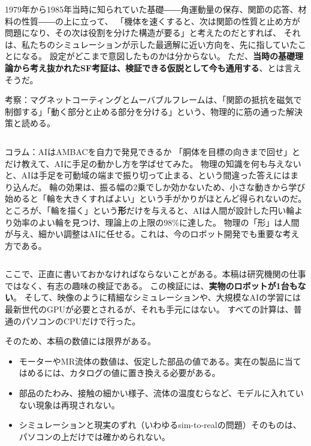 \documentclass[paper=a4paper,fontsize=10pt,twocolumn,column_gap=2zw,line_length=24zw,number_of_lines=46,head_space=18mm]{jlreq}
\makeatletter
\newcounter{msec}
\renewcommand{\section}{\@ifstar{\msecstar}{\msecbox}}
\newcommand{\msecstar}[1]{\par\addvspace{0.6\baselineskip}\noindent{\bfseries\color{accent2}#1}\par\nopagebreak\vspace{0.2\baselineskip}}
\newcommand{\msecbox}[1]{\par\addvspace{0.8\baselineskip}\refstepcounter{msec}%
  \noindent\colorbox{accent2}{\parbox{\dimexpr\linewidth-2\fboxsep}{\color{white}\bfseries\large\strut\themsec\quad #1}}%
  \par\nopagebreak\vspace{0.4\baselineskip}\nopagebreak}
\makeatother
\begin{document}
1979年から1985年当時に知られていた基礎――角運動量の保存、関節の応答、材料の性質――の上に立って、
「機体を速くすると、次は関節の性質と止め方が問題になり、その次は役割を分けた構造が要る」と考えたのだとすれば、
それは、私たちのシミュレーションが示した最適解に近い方向を、先に指していたことになる。
設定がどこまで意図したものかは分からない。
ただ、\textbf{当時の基礎理論から考え抜かれたSF考証は、検証できる仮説として今も通用する}、とは言えそうだ。

\begin{verdict}
考察：マグネットコーティングとムーバブルフレームは、「関節の抵抗を磁気で制御する」「動く部分と止める部分を分ける」という、物理的に筋の通った解決策と読める。
\end{verdict}

\begin{column}{コラム：AIはAMBACを自力で発見できるか}
「胴体を目標の向きまで回せ」とだけ教えて、AIに手足の動かし方を学ばせてみた。
物理の知識を何も与えないと、AIは手足を可動域の端まで振り切って止まる、という間違った答えにはまり込んだ。
輪の効果は、振る幅の2乗でしか効かないため、小さな動きから学び始めると「輪を大きくすればよい」という手がかりがほとんど得られないのだ。
ところが、「輪を描く」という\textbf{形}だけを与えると、AIは人間が設計した円い輪より効率のよい輪を見つけ、理論上の上限の98\%に達した。
物理の「形」は人間が与え、細かい調整はAIに任せる。これは、今のロボット開発でも重要な考え方である。
\end{column}

\section{舞台裏：実機もGPUもない}

ここで、正直に書いておかなければならないことがある。本稿は研究機関の仕事ではなく、有志の趣味の検証である。
この検証には、\textbf{実物のロボットが1台もない}。
そして、映像のように精細なシミュレーションや、大規模なAIの学習には最新世代のGPUが必要とされるが、それも手元にはない。
すべての計算は、普通のパソコンのCPUだけで行った。

そのため、本稿の数値には限界がある。
\begin{itemize}\setlength{\itemsep}{0pt}
\item モーターやMR流体の数値は、仮定した部品の値である。実在の製品に当てはめるには、カタログの値に置き換える必要がある。
\item 部品のたわみ、接触の細かい様子、流体の温度むらなど、モデルに入れていない現象は再現されない。
\item シミュレーションと現実のずれ（いわゆるsim-to-realの問題）そのものは、パソコンの上だけでは確かめられない。
\end{itemize}
\end{document}
